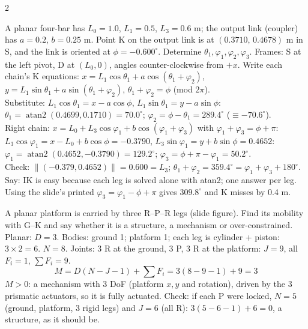 \begin{multicols}{2}
\begin{examq}
A planar four-bar has $L_0=1.0$, $L_1=0.5$, $L_3=0.6$ m; the output link (coupler) has $a=0.2$, $b=0.25$ m. Point K on the output link is at $(0.3710,\,0.4678)$ m in {S}, and the link is oriented at $\phi=-0.600^\circ$. Determine $\theta_1,\varphi_1,\varphi_2,\varphi_3$.
\solution
Frames: {S} at the left pivot, {D} at $(L_0,0)$, angles counter-clockwise from $+x$. Write each chain's K equations: $x=L_1\cos\theta_1+a\cos(\theta_1+\varphi_2)$, $y=L_1\sin\theta_1+a\sin(\theta_1+\varphi_2)$, $\theta_1+\varphi_2=\phi$ (mod $2\pi$).\\
Substitute: $L_1\cos\theta_1=x-a\cos\phi$, $L_1\sin\theta_1=y-a\sin\phi$: $\theta_1=\operatorname{atan2}(0.4699,0.1710)=\boxed{70.0^\circ}$; $\varphi_2=\phi-\theta_1=\boxed{289.4^\circ}$ ($\equiv-70.6^\circ$).\\
Right chain: $x=L_0+L_3\cos\varphi_1+b\cos(\varphi_1+\varphi_3)$ with $\varphi_1+\varphi_3=\phi+\pi$: $L_3\cos\varphi_1=x-L_0+b\cos\phi=-0.3790$, $L_3\sin\varphi_1=y+b\sin\phi=0.4652$: $\varphi_1=\operatorname{atan2}(0.4652,-0.3790)=\boxed{129.2^\circ}$; $\varphi_3=\phi+\pi-\varphi_1=\boxed{50.2^\circ}$.\\
Check: $\lVert(-0.379,0.4652)\rVert=0.600=L_3$; $\theta_1+\varphi_2=359.4^\circ=\varphi_1+\varphi_3+180^\circ$. Say: IK is easy because each leg is solved alone with atan2; one answer per leg. Using the slide's printed $\varphi_3=\varphi_1-\phi+\pi$ gives $309.8^\circ$ and K misses by 0.4 m.
\end{examq}

\begin{examq}
A planar platform is carried by three R--P--R legs (slide figure). Find its mobility with G--K and say whether it is a structure, a mechanism or over-constrained.
\solution
Planar: $D=3$. Bodies: ground 1; platform 1; each leg is cylinder + piston: $3\times2=6$. $N=8$. Joints: 3 R at the ground, 3 P, 3 R at the platform: $J=9$, all $F_i=1$, $\sum F_i=9$.
\[M=D(N-J-1)+\sum F_i=3(8-9-1)+9=\boxed{3}\]
$M>0$: a mechanism with 3 DoF (platform $x,y$ and rotation), driven by the 3 prismatic actuators, so it is fully actuated. Check: if each P were locked, $N=5$ (ground, platform, 3 rigid legs) and $J=6$ (all R): $3(5-6-1)+6=0$, a structure, as it should be.
\end{examq}


\end{multicols}
